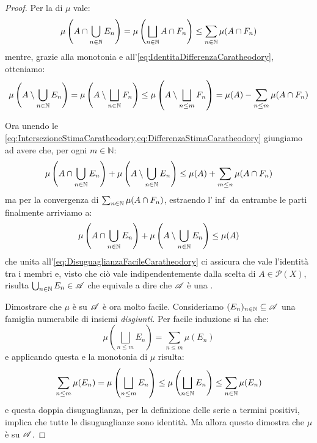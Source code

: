\begin{proof}
	Per la \sigsubadd[ità] di $\mu$ vale:
	\begin{equation}\label{eq:IntersezioneStimaCaratheodory}
		\mu\left(A\cap\bigcup_{n\in\mathbb N} E_n\right)=\mu\left(\bigsqcup_{n\in\mathbb N} A\cap F_n\right)\le
		\sum_{n\in\mathbb N} \mu(A\cap F_n)
	\end{equation}
	mentre, grazie alla monotonia e all'\cref{eq:IdentitaDifferenzaCaratheodory}, otteniamo:
	\begin{equation}\label{eq:DifferenzaStimaCaratheodory}
		\mu\left(A\setminus\bigcup_{n\in\mathbb N} E_n\right) = \mu\left(A\setminus\bigsqcup_{n\in\mathbb N} F_n\right) \le \mu\left(A\setminus\bigsqcup_{n\le m} F_n\right) = 
		\mu(A)-\sum_{n\le m}\mu(A\cap F_n)
	\end{equation}
	
	Ora unendo le \cref{eq:IntersezioneStimaCaratheodory,eq:DifferenzaStimaCaratheodory} giungiamo ad avere che, per ogni $m\in\mathbb{N}$:
	\begin{equation*}
		\mu\left(A\cap\bigcup_{n\in\mathbb N} E_n\right)+\mu\left(A\setminus\bigcup_{n\in\mathbb N} E_n\right)\le
		\mu(A)+\sum_{m\le n}\mu(A\cap F_n) 
	\end{equation*}
	ma per la convergenza di $\sum_{n\in \mathbb N}\mu(A\cap F_n)$, estraendo l'$\inf$ da entrambe le parti finalmente arriviamo a:
	\begin{equation*}
		\mu\left(A\cap\bigcup_{n\in\mathbb N} E_n\right)+\mu\left(A\setminus\bigcup_{n\in\mathbb N} E_n\right)\le
		\mu(A)
	\end{equation*}
	che unita all'\cref{eq:DisuguaglianzaFacileCaratheodory} ci assicura che vale l'identità tra i membri e, visto che ciò vale indipendentemente dalla scelta di $A\in\mathcal P(X)$, risulta $\bigcup_{n\in\mathbb N}E_n\in\mathscr A$ che equivale a dire che $\mathscr A$ è una \sigalg{}.
	
	Dimostrare che $\mu$ è \sigadd{} su $\mathscr A$ è ora molto facile.
	Consideriamo $(E_n)_{n\in\mathbb N}\subseteq \mathscr A$ una famiglia numerabile di insiemi \emph{disgiunti}. Per facile induzione si ha che:
	\begin{equation*}
		\mu\left(\bigsqcup_{n\le m}E_n\right)=\sum_{n\le m} \mu(E_n)
	\end{equation*}
	e applicando questa e la monotonia di $\mu$ risulta:
	\begin{equation*}
		\sum_{n\le m} \mu(E_n)=\mu\left(\bigsqcup_{n\le m}E_n\right)\le
		\mu\left(\bigsqcup_{n\in\mathbb N}E_n\right)\le \sum_{n\in\mathbb N} \mu(E_n)
	\end{equation*}
	e questa doppia disuguaglianza, per la definizione delle serie a termini positivi, implica che tutte le disuguaglianze sono identità. Ma allora questo dimostra che $\mu$ è \sigadd{} su $\mathscr A$.
	

\end{proof}
